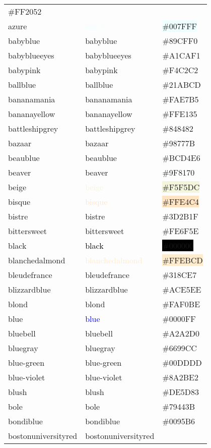 \documentclass[
]{article}
\begin{document}
\begin{longtable}[]{@{}lll@{}}
\colorbox{awesome}{\#FF2052}\tabularnewline
azure & \textcolor{azure}{azure} &
\colorbox{azure}{\#007FFF}\tabularnewline
babyblue & \textcolor{babyblue}{babyblue} &
\colorbox{babyblue}{\#89CFF0}\tabularnewline
babyblueeyes & \textcolor{babyblueeyes}{babyblueeyes} &
\colorbox{babyblueeyes}{\#A1CAF1}\tabularnewline
babypink & \textcolor{babypink}{babypink} &
\colorbox{babypink}{\#F4C2C2}\tabularnewline
ballblue & \textcolor{ballblue}{ballblue} &
\colorbox{ballblue}{\#21ABCD}\tabularnewline
bananamania & \textcolor{bananamania}{bananamania} &
\colorbox{bananamania}{\#FAE7B5}\tabularnewline
bananayellow & \textcolor{bananayellow}{bananayellow} &
\colorbox{bananayellow}{\#FFE135}\tabularnewline
battleshipgrey & \textcolor{battleshipgrey}{battleshipgrey} &
\colorbox{battleshipgrey}{\#848482}\tabularnewline
bazaar & \textcolor{bazaar}{bazaar} &
\colorbox{bazaar}{\#98777B}\tabularnewline
beaublue & \textcolor{beaublue}{beaublue} &
\colorbox{beaublue}{\#BCD4E6}\tabularnewline
beaver & \textcolor{beaver}{beaver} &
\colorbox{beaver}{\#9F8170}\tabularnewline
beige & \textcolor{beige}{beige} &
\colorbox{beige}{\#F5F5DC}\tabularnewline
bisque & \textcolor{bisque}{bisque} &
\colorbox{bisque}{\#FFE4C4}\tabularnewline
bistre & \textcolor{bistre}{bistre} &
\colorbox{bistre}{\#3D2B1F}\tabularnewline
bittersweet & \textcolor{bittersweet}{bittersweet} &
\colorbox{bittersweet}{\#FE6F5E}\tabularnewline
black & \textcolor{black}{black} &
\colorbox{black}{\#000000}\tabularnewline
blanchedalmond & \textcolor{blanchedalmond}{blanchedalmond} &
\colorbox{blanchedalmond}{\#FFEBCD}\tabularnewline
bleudefrance & \textcolor{bleudefrance}{bleudefrance} &
\colorbox{bleudefrance}{\#318CE7}\tabularnewline
blizzardblue & \textcolor{blizzardblue}{blizzardblue} &
\colorbox{blizzardblue}{\#ACE5EE}\tabularnewline
blond & \textcolor{blond}{blond} &
\colorbox{blond}{\#FAF0BE}\tabularnewline
blue & \textcolor{blue}{blue} & \colorbox{ao}{\#0000FF}\tabularnewline
bluebell & \textcolor{bluebell}{bluebell} &
\colorbox{bluebell}{\#A2A2D0}\tabularnewline
bluegray & \textcolor{bluegray}{bluegray} &
\colorbox{bluegray}{\#6699CC}\tabularnewline
blue-green & \textcolor{blue-green}{blue-green} &
\colorbox{blue-green}{\#00DDDD}\tabularnewline
blue-violet & \textcolor{blue-violet}{blue-violet} &
\colorbox{blue-violet}{\#8A2BE2}\tabularnewline
blush & \textcolor{blush}{blush} &
\colorbox{blush}{\#DE5D83}\tabularnewline
bole & \textcolor{bole}{bole} & \colorbox{bole}{\#79443B}\tabularnewline
bondiblue & \textcolor{bondiblue}{bondiblue} &
\colorbox{bondiblue}{\#0095B6}\tabularnewline
bostonuniversityred &
\textcolor{bostonuniversityred}{bostonuniversityred} &

\end{longtable}
\end{document}
